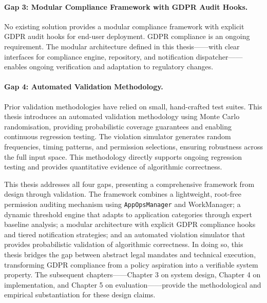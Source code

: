 \paragraph{Gap 3: Modular Compliance Framework with GDPR Audit Hooks.} No existing solution provides a modular compliance framework with explicit GDPR audit hooks for end-user deployment. GDPR compliance is an ongoing requirement. The modular architecture defined in this thesis——with clear interfaces for compliance engine, repository, and notification dispatcher——enables ongoing verification and adaptation to regulatory changes.

\paragraph{Gap 4: Automated Validation Methodology.} Prior validation methodologies have relied on small, hand-crafted test suites. This thesis introduces an automated validation methodology using Monte Carlo randomisation, providing probabilistic coverage guarantees and enabling continuous regression testing. The violation simulator generates random frequencies, timing patterns, and permission selections, ensuring robustness across the full input space. This methodology directly supports ongoing regression testing and provides quantitative evidence of algorithmic correctness.

This thesis addresses all four gaps, presenting a comprehensive framework from design through validation. The framework combines a lightweight, root-free permission auditing mechanism using \texttt{AppOpsManager} and WorkManager; a dynamic threshold engine that adapts to application categories through expert baseline analysis; a modular architecture with explicit GDPR compliance hooks and tiered notification strategies; and an automated violation simulator that provides probabilistic validation of algorithmic correctness. In doing so, this thesis bridges the gap between abstract legal mandates and technical execution, transforming GDPR compliance from a policy aspiration into a verifiable system property. The subsequent chapters——Chapter 3 on system design, Chapter 4 on implementation, and Chapter 5 on evaluation——provide the methodological and empirical substantiation for these design claims.
